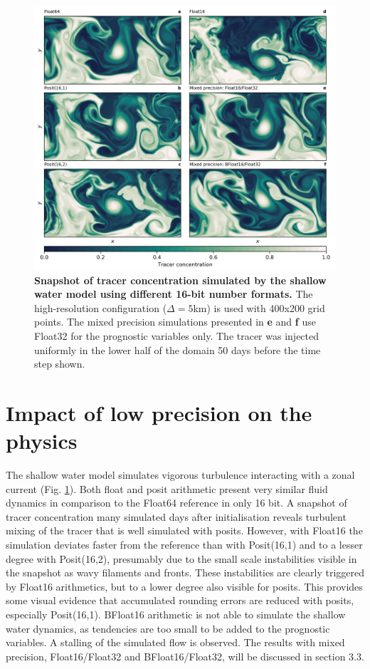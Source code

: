 \begin{figure}[htbp]
\includegraphics[width=1\textwidth]{Figures/swm/snapshot.png}
\caption{\textbf{Snapshot of tracer concentration simulated by the shallow water model using different 16-bit number formats.}
The high-resolution configuration ($\Delta = 5$km) is used with 400x200 grid points. The mixed precision simulations presented
in \textbf{e} and \textbf{f} use Float32 for the prognostic variables only. The tracer was injected uniformly in the lower half of the
domain 50 days before the time step shown.}
\label{fig:snapshot}
\end{figure}

\section{Impact of low precision on the physics}
\label{sec:swm_physics}

The shallow water model simulates vigorous turbulence interacting with a zonal current (Fig. \ref{fig:snapshot}). Both float and
posit arithmetic present very similar fluid dynamics in comparison to the Float64 reference in only 16 bit. A snapshot of tracer
concentration many simulated days after initialisation reveals turbulent mixing of the tracer that is well simulated with posits.
However, with Float16 the simulation deviates faster from the reference than with Posit(16,1) and to a lesser degree with Posit(16,2),
presumably due to the small scale instabilities visible in the snapshot as wavy filaments and fronts. These instabilities are clearly
triggered by Float16 arithmetics, but to a lower degree also visible for posits. This provides some visual evidence that accumulated
rounding errors are reduced with posits, especially Posit(16,1). BFloat16 arithmetic is not able to simulate the shallow water dynamics,
as tendencies are too small to be added to the prognostic variables. A stalling of the simulated flow is observed. The results with
mixed precision, Float16/Float32 and BFloat16/Float32, will be discussed in section 3.3.

